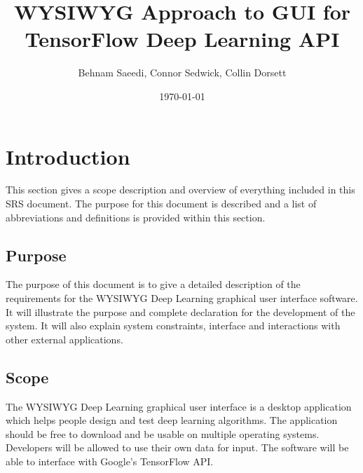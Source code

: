 \documentclass[a4paper,10pt]{article} \usepackage[margin=1.0in]{geometry} \usepackage{pdfpages} \usepackage{graphicx}
\title{WYSIWYG Approach to GUI for TensorFlow Deep Learning API}
\author{Behnam Saeedi, Connor Sedwick, Collin Dorsett}
\date{\today}
\begin{document}
\maketitle
\newpage
\tableofcontents
\newpage
\section{Introduction}

This section gives a scope description and overview of everything included in this SRS document. 
The purpose for this document is described and a list of abbreviations and definitions is provided within this section.

\subsection{Purpose}

The purpose of this document is to give a detailed description of the requirements for the WYSIWYG Deep Learning graphical user interface software. It will illustrate the purpose and complete declaration for the development of the system. It will also explain system constraints, interface and interactions with other external applications. 

\subsection{Scope}

The WYSIWYG Deep Learning graphical user interface is a desktop application which helps people design and test deep learning algorithms.
The application should be free to download and be usable on multiple operating systems.
Developers will be allowed to use their own data for input.
The software will be able to interface with Google's TensorFlow API. 
\end{document}
